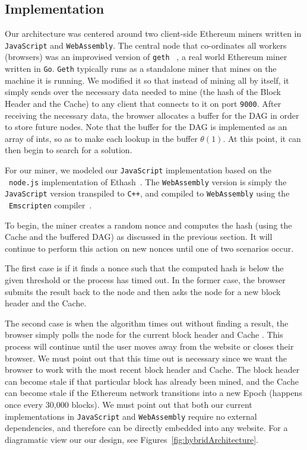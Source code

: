 \documentclass[runningheads]{llncs}
\begin{document}
\subsection{Implementation}

Our architecture was centered around two client-side Ethereum miners written in \verb|JavaScript| and \verb|WebAssembly|. The central node that co-ordinates all workers (browsers) was an improvised version of \verb|geth| ~\cite{geth}, a real world Ethereum miner written in \verb|Go|. \verb|Geth| typically runs as a standalone miner that mines on the machine it is running. We modified it so that instead of mining all by itself, it simply sends over the necessary data needed to mine (the hash of the Block Header and the Cache) to any client that connects to it on port \verb|9000|. After receiving the necessary data, the browser allocates a buffer for the DAG in order to store future nodes. Note that the buffer for the DAG is implemented as an array of ints, so as to make each lookup in the buffer $\theta(1)$. At this point, it can then begin to search for a solution. 

For our miner, we modeled our \verb|JavaScript| implementation based on the ~\verb|node.js| implementation of Ethash~\cite{ethash}. The \verb|WebAssembly| version is simply the \verb|JavaScript| version transpiled to \verb|C++|, and compiled to \verb|WebAssembly| using the ~\verb|Emscripten| compiler~\cite{emscripten}. 

To begin, the miner creates a random nonce and computes the hash (using the Cache and the buffered DAG) as discussed in the previous section. It will continue to perform this action on new nonces until one of two scenarios occur. 

The first case is if it finds a nonce such that the computed hash is below the given threshold or the process has timed out. In the former case, the browser submits the result back to the node and then asks the node for a new block header and the Cache. 

The second case is when the algorithm times out without finding a result, the browser simply polls the node for the current block header and Cache . This process will continue until the user moves away from the website or closes their browser. 
We must point out that this time out is necessary since we want the browser to work with the most recent block header and Cache. The block header can become stale if that particular block has already been mined, and the Cache can become stale if the Ethereum network transitions into a new Epoch (happens once every 30,000 blocks). 
We must point out that both our current implementations in \verb|JavaScript| and \verb|WebAssembly| require no external dependencies, and therefore can be directly embedded into any website. For a diagramatic view our our design, see Figures~\ref{fig:hybridArchitecture}.
\end{document}
